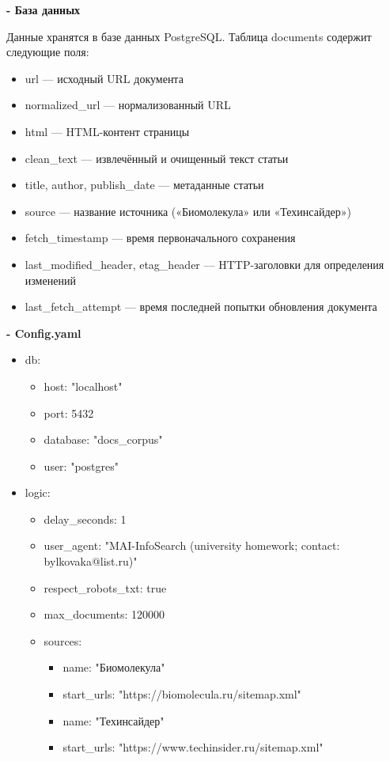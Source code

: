 \documentclass[pdf, unicode, 12pt, a4paper, oneside, fleqn]{article}
\begin{document}
\textbf{- База данных}

Данные хранятся в базе данных PostgreSQL. Таблица documents 
содержит следующие поля: 

\begin{itemize}
    \item url — исходный URL документа
    \item normalized\_url — нормализованный URL
    \item html — HTML-контент страницы
    \item clean\_text — извлечённый и очищенный текст статьи
    \item title, author, publish\_date — метаданные статьи
    \item source — название источника («Биомолекула» или «Техинсайдер»)
    \item fetch\_timestamp — время первоначального сохранения
    \item last\_modified\_header, etag\_header — HTTP-заголовки для определения изменений
    \item last\_fetch\_attempt — время последней попытки обновления документа
\end{itemize}

\textbf{- Config.yaml}

\begin{itemize}
    \item db:
    \begin{itemize}
        \item host: "localhost"
        \item port: 5432
        \item database: "docs\_corpus"
        \item user: "postgres"
    \end{itemize}
    \item logic:
    \begin{itemize}
        \item delay\_seconds: 1
        \item user\_agent: "MAI-InfoSearch (university homework; contact: bylkovaka@list.ru)"
        \item respect\_robots\_txt: true
        \item max\_documents: 120000
        \item sources:
        \begin{itemize}
            \item name: "Биомолекула"
            \item start\_urls: "https://biomolecula.ru/sitemap.xml"
            \item name: "Техинсайдер"
            \item start\_urls: "https://www.techinsider.ru/sitemap.xml"
        \end{itemize}
    \end{itemize}

\end{itemize}
\end{document}
